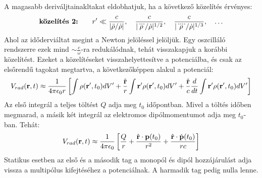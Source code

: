 \documentclass[../main.tex]{subfiles}
\begin{document}
A magasabb deriváljtainakltakat eldobhatjuk, ha a következő közelítés érvényes:
\begin{equation}
    \text{\textbf{közelítés 2:}} \qquad r' \ll \frac{c}{|\ddot{\rho}/\dot{\rho}|}, \quad \frac{c}{|\dddot{\rho}/\dot{\rho}|^{1/2}}, \quad \frac{c}{|\ddddot{\rho}/\dot{\rho}|^{1/3}}, \quad \ldots
\end{equation}
Ahol az időderviáltat megint a Newton jelöléssel jelöljük. Egy oszcilláló rendszerre ezek mind $\sim \frac{c}{\omega}$-ra redukálódnak, tehát visszakapjuk a korábbi közelítést.
Ezeket a közelítéseket visszahelyettesítve a potenciálba, és csak az elsőrendű tagokat megtartva, a következőképpen alakul a potenciál:
\begin{equation}
    V_{rad}(\bold{r}, t) \approx \frac{1}{4 \pi \epsilon_0 r} \left[\int \rho(\bold{r'}, t_0) dV' + \frac{\hat{\bold{r}}}{r} \int \bold{r'} \rho(\bold{r'}, t_0) dV' + \frac{\hat{\bold{r}}}{c} \frac{d}{dt} \int \bold{r'} \rho(\bold{r'}, t_0) dV' \right]
\end{equation}
Az első integrál a teljes töltést $Q$ adja meg $t_0$ időpontban. Mivel a töltés időben megmarad, a másik két integrál az elektromos dipólmomentumot adja meg $t_0$-ban. Tehát:
\begin{equation}
    V_{rad}(\bold{r}, t) \approx \frac{1}{4 \pi \epsilon_0} \left[ \frac{Q}{r} + \frac{\hat{\bold{r}} \cdot \bold{p}(t_0)}{r^2} + \frac{\hat{\bold{r}} \cdot \dot{\bold{p}}(t_0)}{rc} \right]
\end{equation} 
Statikus esetben az első és a második tag a monopól és dipól hozzájárulást adja vissza a multipólus kifejtéséhez a potenciálnak. A harmadik tag pedig nulla lenne.
\end{document}
